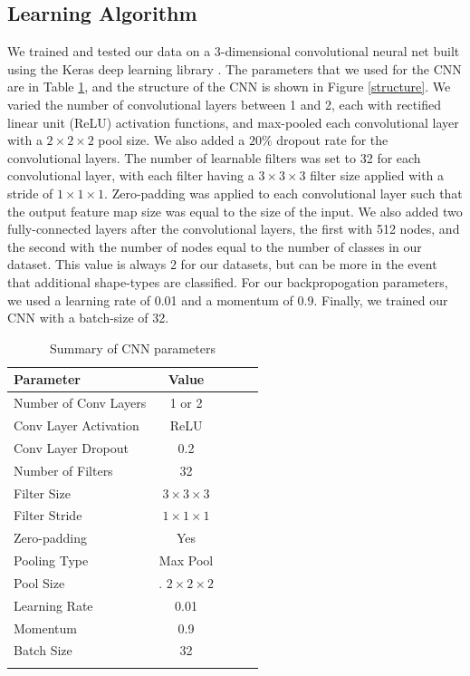\documentclass{article}
\begin{document}
\subsection{Learning Algorithm}
We trained and tested our data on a 3-dimensional convolutional neural net built using the
Keras deep learning library \cite{chollet2015keras}. The parameters that we used for the
CNN are in Table \ref{CNN_params}, and the structure of the CNN is shown in
Figure \ref{structure}. We varied the number of convolutional layers between 1 and 2,
each with rectified linear unit (ReLU) activation functions, and max-pooled each
convolutional layer with a $2\times2\times2$ pool size. We also added a $20\%$
dropout rate for the convolutional layers. The number of learnable filters was
set to 32 for each convolutional layer, with each filter having a $3\times3\times3$
filter size applied with a stride of $1\times1\times1$. Zero-padding was applied to
each convolutional layer such that the output feature map size was equal to the size of the input.
We also added two fully-connected layers after the convolutional layers, the first with 512 nodes,
and the second with the number of nodes equal to the number of classes in our dataset.
This value is always 2 for our datasets, but can be more in the event that additional
shape-types are classified. For our backpropogation parameters, we used a learning
rate of 0.01 and a momentum of 0.9.  Finally, we trained our CNN with a batch-size of 32.



\begin{table}[t]
\vskip 0.15in
\begin{center}
\begin{small}
\begin{sc}
\begin{tabular}{lcccr}
\hline
\abovespace\belowspace
Parameter & Value \\
\hline
\abovespace
Number of Conv Layers    & 1 or 2 \\
Conv Layer Activation & ReLU\\
Conv Layer Dropout  & 0.2  \\
Number of Filters  & 32   \\
Filter Size  &  $3\times 3\times 3$    \\
Filter Stride      &   $1\times 1\times 1$   \\
Zero-padding  & Yes\\
Pooling Type & Max Pool \\
Pool Size    &.  $2\times 2\times 2$ \\
Learning Rate   & 0.01\\
Momentum    & 0.9\\
Batch Size   & 32\\
\belowspace
\end{tabular}
\end{sc}
\end{small}
\end{center}
\vskip -0.1in
\caption{Summary of CNN parameters}
\label{CNN_params}
\end{table}
\end{document}

